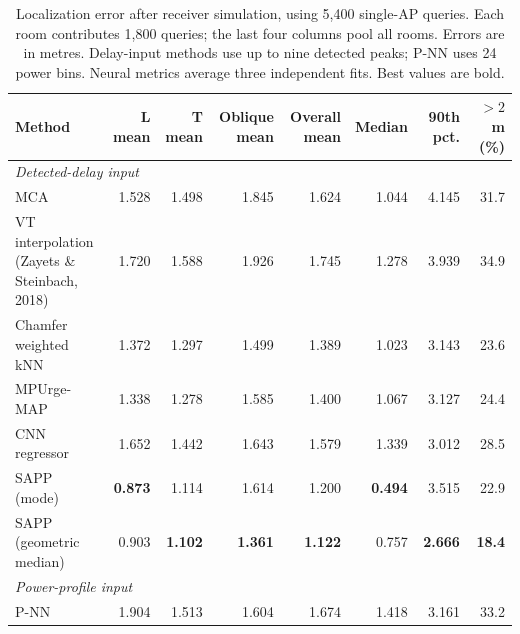 \begin{table}[t]
\centering
\caption{Localization error after receiver simulation, using 5,400 single-AP queries. Each room contributes 1,800 queries; the last four columns pool all rooms. Errors are in metres. Delay-input methods use up to nine detected peaks; P-NN uses 24 power bins. Neural metrics average three independent fits. Best values are bold.}
\label{tab:main}
\setlength{\tabcolsep}{5.5pt}
\begin{tabular}{lrrrrrrr}
\toprule
Method & L mean & T mean & Oblique mean & Overall mean & Median & 90th pct. & $>2$ m (\%)\\
\midrule
\multicolumn{8}{l}{\emph{Detected-delay input}}\\
MCA & 1.528 & 1.498 & 1.845 & 1.624 & 1.044 & 4.145 & 31.7\\
\shortstack[l]{VT interpolation\\(Zayets \& Steinbach, 2018)} & 1.720 & 1.588 & 1.926 & 1.745 & 1.278 & 3.939 & 34.9\\
Chamfer weighted kNN & 1.372 & 1.297 & 1.499 & 1.389 & 1.023 & 3.143 & 23.6\\
MPUrge-MAP & 1.338 & 1.278 & 1.585 & 1.400 & 1.067 & 3.127 & 24.4\\
CNN regressor & 1.652 & 1.442 & 1.643 & 1.579 & 1.339 & 3.012 & 28.5\\
SAPP (mode) & \textbf{0.873} & 1.114 & 1.614 & 1.200 & \textbf{0.494} & 3.515 & 22.9\\
SAPP (geometric median) & 0.903 & \textbf{1.102} & \textbf{1.361} & \textbf{1.122} & 0.757 & \textbf{2.666} & \textbf{18.4}\\
\midrule
\multicolumn{8}{l}{\emph{Power-profile input}}\\
P-NN \cite{oh2024pnn} & 1.904 & 1.513 & 1.604 & 1.674 & 1.418 & 3.161 & 33.2\\
\bottomrule
\end{tabular}
\end{table}
